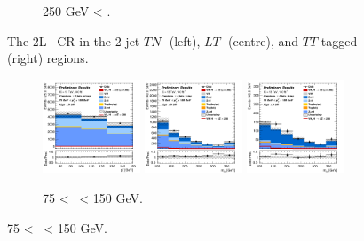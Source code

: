 \begin{figure}[h!]
\begin{subfigure}[b]{\textwidth}
        \caption{250 GeV < \ptv.}
        \label{fig:plots_VHcc_2L_250_CRH_2J}
    \end{subfigure}
    \caption{The 2L \highdr\ CR in the 2-jet $TN$- (left), $LT$- (centre), and $TT$-tagged (right) regions.}
    \label{fig:plots_VHcc_2L_CRH_2J}
\end{figure}

\vspace*{\fill} \newpage
\vspace*{\fill} 

\begin{figure}[h!]
    \centering
    \begin{subfigure}[b]{\textwidth}
        \centering
        \includegraphics[width=0.32\textwidth]{Images/VH/Own_fit/prefit_VHcc/Region_distpTV_BMax150_BMin75_DCRHigh_J3_TTypent_incJet1_T1_L2_Y6051_Prefit.png}
        \includegraphics[width=0.32\textwidth]{Images/VH/Own_fit/prefit_VHcc/Region_distmBB_BMax150_BMin75_DCRHigh_J3_TTypelt_incJet1_T2_L2_Y6051_Prefit.png}
        \includegraphics[width=0.32\textwidth]{Images/VH/Own_fit/prefit_VHcc/Region_distmBB_BMax150_BMin75_DCRHigh_J3_TTypett_incJet1_T2_L2_Y6051_Prefit.png}
        \caption{75 < \ptv\ < 150 GeV.}
        \label{fig:plots_VHcc_2L_75_CRH_3J}
    \end{subfigure}

\end{figure}
